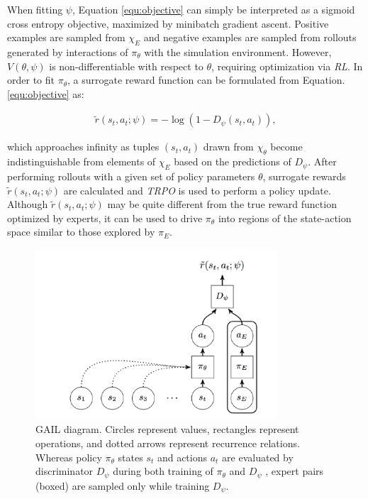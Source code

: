 When fitting $\psi$, Equation \ref{equ:objective} can simply be interpreted as a sigmoid cross entropy objective, maximized by minibatch gradient ascent. 
Positive examples are sampled from $\chi_E$ and negative examples are sampled from rollouts generated by interactions of $\pi_\theta$ with the simulation environment. 
However, $V(\theta,\psi)$ is non-differentiable with respect to $\theta$, requiring optimization via {\it RL}.
In order to fit $\pi_\theta$, a surrogate reward function can be formulated from Equation. \ref{equ:objective} as:

\begin{eqnarray}
\tilde{r}(s_t,a_t;\psi)=-\log (1-D_{\psi}(s_t,a_t)) ,
\end{eqnarray}

which approaches infinity as tuples $(s_t,a_t)$ drawn from $\chi_\theta$ become indistinguishable from elements of $\chi_E$ based on the predictions of $D_\psi$. 
After performing rollouts with a given set of policy parameters $\theta$, surrogate rewards $\tilde{r}(s_t,a_t;\psi)$ are calculated and {\it TRPO} is used to perform a policy update.
Although $\tilde{r}(s_t,a_t;\psi)$ may be quite different from the true reward function optimized by experts, it can be used to drive $\pi_\theta$ into regions of the state-action space similar to those explored by $\pi_E$.


\begin{figure}[H]
\begin{center}
\includegraphics[width=9cm]{./figures/gail_diagram.png}
\caption{GAIL diagram. Circles represent values, rectangles represent operations, and dotted arrows represent recurrence relations. Whereas policy $\pi_\theta$ states $s_t$ and actions $a_t$ are evaluated by discriminator $D_\psi$ during both training of $\pi_\theta$ and $D_\psi$ , expert pairs (boxed) are sampled only while training $D_\psi$.}
\label{fig:gail_diagram}
\end{center}
\end{figure}
